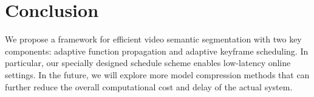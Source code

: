 \documentclass[a4paper,12pt]{article}
\begin{document}
\section{Conclusion} 
We propose a framework for efficient video semantic segmentation with two key components: adaptive function propagation and adaptive keyframe scheduling. In particular, our specially designed schedule scheme enables low-latency online settings. In the future, we will explore more model compression methods that can further reduce the overall computational cost and delay of the actual system.	
 

%  
%
 
   
\end{document}
